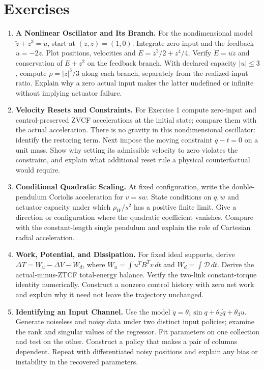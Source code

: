 \section{Exercises}
\begin{enumerate}
\item\label{ex:ch7:duffing} \textbf{A Nonlinear Oscillator and Its Branch.} For the nondimensional model $\ddot z+z^3=u$, start at $(z,\dot z)=(1,0)$. Integrate zero input and the feedback $u=-2z$. Plot positions, velocities and $E=\dot z^2/2+z^4/4$. Verify $\dot E=u\dot z$ and conservation of $E+z^2$ on the feedback branch. With declared capacity $|u|\leq3$, compute $\rho=|z|^3/3$ along each branch, separately from the realized-input ratio. Explain why a zero actual input makes the latter undefined or infinite without implying actuator failure.
\item\label{ex:ch7:zvcf} \textbf{Velocity Resets and Constraints.} For Exercise 1 compute zero-input and control-preserved ZVCF accelerations at the initial state; compare them with the actual acceleration. There is no gravity in this nondimensional oscillator: identify the restoring term. Next impose the moving constraint $q-t=0$ on a unit mass. Show why setting its admissible velocity to zero violates the constraint, and explain what additional reset rule a physical counterfactual would require.
\item\label{ex:ch7:scaling} \textbf{Conditional Quadratic Scaling.} At fixed configuration, write the double-pendulum Coriolis acceleration for $v=sw$. State conditions on $q,w$ and actuator capacity under which $\rho_W/s^2$ has a positive finite limit. Give a direction or configuration where the quadratic coefficient vanishes. Compare with the constant-length single pendulum and explain the role of Cartesian radial acceleration.
\item\label{ex:ch7:energy} \textbf{Work, Potential, and Dissipation.} For fixed ideal supports, derive $\Delta T=W_u-\Delta V-W_d$, where $W_u=\int u^TB^Tv\,dt$ and $W_d=\int\mathcal D\,dt$. Derive the actual-minus-ZTCF total-energy balance. Verify the two-link constant-torque identity numerically. Construct a nonzero control history with zero net work and explain why it need not leave the trajectory unchanged.
\item\label{ex:ch7:identification} \textbf{Identifying an Input Channel.} Use the model $\ddot q=\theta_1\sin q+\theta_2\dot q+\theta_3u$. Generate noiseless and noisy data under two distinct input policies; examine the rank and singular values of the regressor. Fit parameters on one collection and test on the other. Construct a policy that makes a pair of columns dependent. Repeat with differentiated noisy positions and explain any bias or instability in the recovered parameters.

\end{enumerate}

